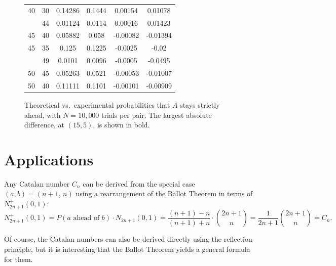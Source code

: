 \documentclass[11pt]{article}
\theoremstyle{plain}
\begin{document}
\begin{figure}[H]
\begin{tabular}{
      S[table-format=2.0]
      S[table-format=2.0]
      S[table-format=1.5]
      S[table-format=1.4]
      S[table-format=-1.5]
      S[table-format=-1.5]}
    40 & 30 & 0.14286 & 0.1444 &  0.00154 &  0.01078 \\
     & 44 & 0.01124 & 0.0114 &  0.00016 &  0.01423 \\
    45 & 40 & 0.05882 & 0.058  & -0.00082 & -0.01394 \\
    45 & 35 & 0.125   & 0.1225 & -0.0025  & -0.02    \\
     & 49 & 0.0101  & 0.0096 & -0.0005  & -0.0495  \\
    50 & 45 & 0.05263 & 0.0521 & -0.00053 & -0.01007 \\
    50 & 40 & 0.11111 & 0.1101 & -0.00101 & -0.00909 \\
    \bottomrule
  \end{tabular}
  \caption{Theoretical vs.\ experimental probabilities that $A$ stays strictly
           ahead, with $N = 10{,}000$ trials per pair. The largest absolute
           difference, at $(15,5)$, is shown in bold.}
  \label{fig:results}
\end{figure}

\section{Applications}

Any Catalan number $C_n$ can be derived from the special case
$(a,b) = (n+1,\, n)$ using a rearrangement of the Ballot Theorem in terms of $N^{+}_{2n+1}(0,1)$:
\[
N^{+}_{2n+1}(0,1)
  = P(a \text{ ahead of } b) \cdot N_{2n+1}(0,1)
  = \frac{(n+1)-n}{(n+1)+n} \cdot \binom{2n+1}{n}
  = \frac{1}{2n+1}\binom{2n+1}{n}
  = C_n.
\]

Of course, the Catalan numbers can also be derived directly using the reflection
principle, but it is interesting that the Ballot Theorem yields a general
formula for them.
\end{document}
